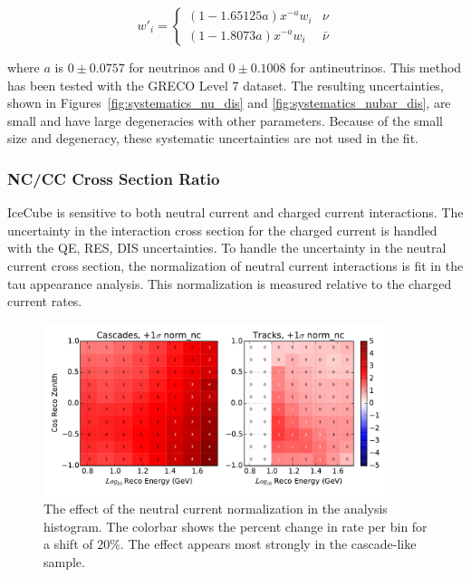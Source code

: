 \begin{equation}
w'_{i} = 
\begin{cases}
(1 - 1.65125 a) x^{-a} w_i & \nu \\
(1 - 1.8073 a) x^{-a} w_i & \bar{\nu}
\end{cases}
\end{equation}

where $a$ is $0 \pm 0.0757$ for neutrinos and $0 \pm 0.1008$ for antineutrinos.
This method has been tested with the GRECO Level 7 dataset.
The resulting uncertainties, shown in Figures~\ref{fig:systematics_nu_dis} and \ref{fig:systematics_nubar_dis}, are small and have large degeneracies with other parameters.
Because of the small size and degeneracy, these systematic uncertainties are not used in the fit.

\label{subsubsec:norm_nc}
\subsubsection{NC/CC Cross Section Ratio}
IceCube is sensitive to both neutral current and charged current interactions.
The uncertainty in the interaction cross section for the charged current is handled with the QE, RES, DIS uncertainties.
To handle the uncertainty in the neutral current cross section, the normalization of neutral current interactions is fit in the tau appearance analysis.
This normalization is measured relative to the charged current rates.

\begin{figure}
\centering
\includegraphics[width=0.9\textwidth]{systematics/norm_nc_variation.pdf} 
\caption[Effect of the neutral current normalization in the analysis histogram]{The effect of the neutral current normalization in the analysis histogram. The colorbar shows the percent change in rate per bin for a shift of 20\%. The effect appears most strongly in the cascade-like sample.}
\label{fig:systematics_norm_nc}
\end{figure}

